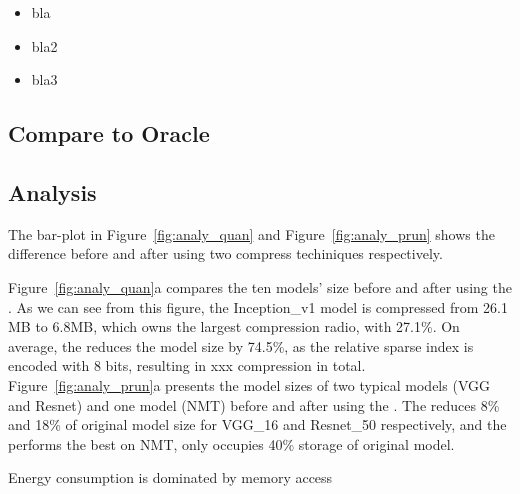 \begin{itemize}
\item bla
\item bla2
\item bla3
\end{itemize}




\subsection{Compare to Oracle}


\subsection{Analysis}
The bar-plot in Figure~\ref{fig:analy_quan} and Figure~\ref{fig:analy_prun}
shows the difference before and after using two compress techiniques respectively.


Figure~\ref{fig:analy_quan}a
compares the ten models' size before and after using the \quantization.
As we can see from this figure, the Inception\_v1 model is
compressed from 26.1 MB to 6.8MB, which 
owns the largest compression radio, with 27.1\%.
On average, the \quantization reduces the model size by 74.5\%, 
as the relative sparse index is encoded with 8 bits, resulting in 
xxx compression in total. Figure~\ref{fig:analy_prun}a presents 
the model sizes of two typical \CNN models (VGG and Resnet) and one \RNN model (NMT) 
before and after using the \pruning.
The \pruning reduces 8\% and 18\% of original model size for VGG\_16 and Resnet\_50 respectively,
and the \pruning performs the best on NMT, only occupies 40\% storage of original model.











Energy consumption is dominated by memory access


